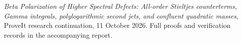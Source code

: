 \emph{Beta Polarization of Higher Spectral Defects: All-order Stieltjes
counterterms, Gamma integrals, polylogarithmic second jets, and confluent
quadratic masses}, ProveIt research continuation, 11 October 2026.
Full proofs and verification records in the accompanying report.
